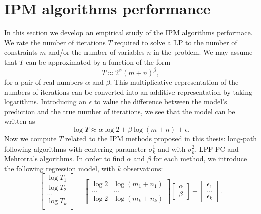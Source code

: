 \documentclass[a4paper,10 pt,titlepage,twoside]{book}
\theoremstyle{plain}
\theoremstyle{definition}
\theoremstyle{remark}
\begin{document}
\section{IPM algorithms performance}
In this section we develop an empirical study of the IPM algorithms performace. \\
We rate the number of iterations $T$ required to solve a LP to the number of constraints $m$ and/or the number of variables $n$ in the problem. We may assume that $T$ can be approximated by a function of the form 
\begin{equation*}
	T \approx 2^{\alpha}(m+n)^{\beta},
\end{equation*}
for a pair of real numbers $\alpha$ and $\beta$. This multiplicative representation of the numbers of iterations can be converted into an additive representation by taking logarithms. Introducing an $\epsilon$ to value the difference between the model's prediction and the true number of iterations, we see that the model can be written as
\begin{equation*}
\log T \approx \alpha \log 2 +\beta \log (m+n) +\epsilon.
\end{equation*}
Now we compute $T$ related to the IPM methods proposed in this thesis: long-path following algorithms with centering parameter $\sigma_{k}^{1}$ and with $\sigma_{k}^{2}$, LPF PC and Mehrotra's algorithms. In order to find $\alpha$ and $\beta$  for each method, we introduce the following regression model, with $k$ observations:\\
\begin{equation}
\begin{bmatrix}
\log T_{1}\\\log T_{2}\\\dots\\\log T_{k}\\
\end{bmatrix}
 =
 \begin{bmatrix}
\log 2&\log (m_{1}+n_{1})\\
\dots&\dots\\
\log 2&\log (m_{k}+n_{k})
\end{bmatrix}\begin{bmatrix}
\alpha\\\beta
\end{bmatrix}
+
\begin{bmatrix}
\epsilon_{1}\\
\dots\\
\epsilon_{k}
\end{bmatrix}.
\end{equation}
\end{document}
